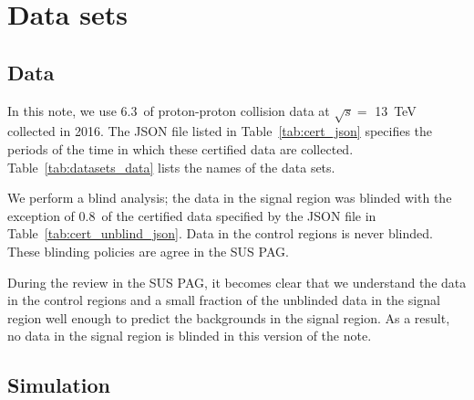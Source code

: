 \section{Data sets}
\label{sec:datasets}

\subsection{Data}


In this note, we use 6.3~\ifb of proton-proton collision data at
$\sqrt{s} =$ 13~TeV collected in 2016. The JSON file listed in
Table~\ref{tab:cert_json} specifies the periods of the time in which
these certified data are collected. Table~\ref{tab:datasets_data} lists
the names of the data sets.

We perform a blind analysis; the data in the signal region was blinded
with the exception of 0.8~\ifb of the certified data specified by the
JSON file in Table~\ref{tab:cert_unblind_json}. Data in the control
regions is never blinded. These blinding policies are agree in the SUS
PAG.

During the review in the SUS PAG, it becomes clear that we understand
the data in the control regions and a small fraction of the unblinded
data in the signal region well enough to predict the backgrounds in
the signal region. As a result, no data in the signal region is
blinded in this version of the note.

\begin{table}[!h]
 \footnotesize
 \label{tab:cert_json}
\end{table}

\begin{table}[!h]
\footnotesize 
\label{tab:datasets_data}
\end{table}

\begin{table}[!h]
 \footnotesize

\label{tab:cert_unblind_json}
\end{table}

\subsection{Simulation}

